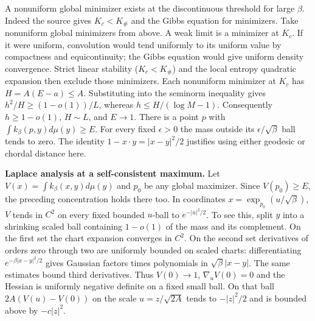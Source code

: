\documentclass[10pt]{article}
\begin{document}
A nonuniform global minimizer exists at the discontinuous threshold for large $\beta$. Indeed the source gives $K_c<K_\#$ and the Gibbs equation for minimizers. Take nonuniform global minimizers from above. A weak limit is a minimizer at $K_c$. If it were uniform, convolution would tend uniformly to its uniform value by compactness and equicontinuity; the Gibbs equation would give uniform density convergence. Strict linear stability ($K_c<K_\#$) and the local entropy quadratic expansion then exclude those minimizers. Each nonuniform minimizer at $K_c$ has $H=A(E-a)\le A$. Substituting into the seminorm inequality gives $h^2/H\ge (1-o(1))/L$, whereas $h\le H/(\log M-1)$. Consequently $h\ge1-o(1)$, $H\sim L$, and $E\to1$. There is a point $p$ with $\int k_\beta(p,y)d\mu(y)\ge E$. For every fixed $\epsilon>0$ the mass outside its $\epsilon/\sqrt\beta$ ball tends to zero. The identity $1-x\cdot y=|x-y|^2/2$ justifies using either geodesic or chordal distance here.

\textbf{Laplace analysis at a self-consistent maximum.} Let $V(x)=\int k_\beta(x,y)d\mu(y)$ and $p_0$ be any global maximizer. Since $V(p_0)\ge E$, the preceding concentration holds there too. In coordinates $x=\exp_{p_0}(u/\sqrt\beta)$, $V$ tends in $C^2$ on every fixed bounded $u$-ball to $e^{-|u|^2/2}$. To see this, split $y$ into a shrinking scaled ball containing $1-o(1)$ of the mass and its complement. On the first set the chart expansion converges in $C^2$. On the second set derivatives of orders zero through two are uniformly bounded on scaled charts: differentiating $e^{-\beta|x-y|^2/2}$ gives Gaussian factors times polynomials in $\sqrt{\beta}|x-y|$. The same estimates bound third derivatives. Thus $V(0)\to1$, $\nabla_u V(0)=0$ and the Hessian is uniformly negative definite on a fixed small ball. On that ball $2A(V(u)-V(0))$ on the scale $u=z/\sqrt{2A}$ tends to $-|z|^2/2$ and is bounded above by $-c|z|^2$.
\end{document}
